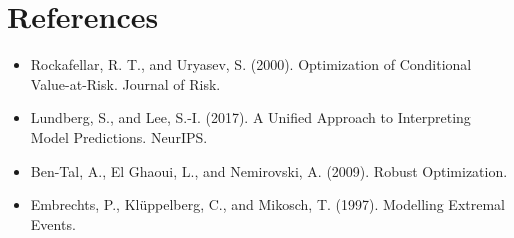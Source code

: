 \documentclass[12pt]{article}
\begin{document}
\section*{References}
\begin{itemize}
\item Rockafellar, R. T., and Uryasev, S. (2000). Optimization of Conditional Value-at-Risk. Journal of Risk.
\item Lundberg, S., and Lee, S.-I. (2017). A Unified Approach to Interpreting Model Predictions. NeurIPS.
\item Ben-Tal, A., El Ghaoui, L., and Nemirovski, A. (2009). Robust Optimization.
\item Embrechts, P., Klüppelberg, C., and Mikosch, T. (1997). Modelling Extremal Events.
\end{itemize}
\end{document}
